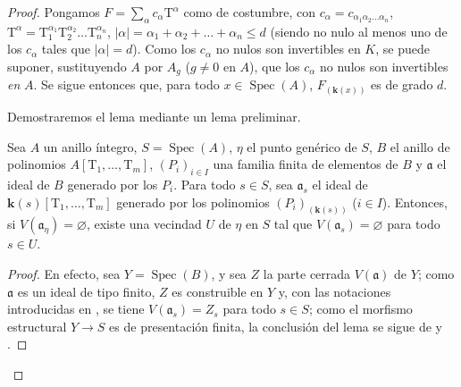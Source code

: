 \begin{proof}
Pongamos $F=\sum_\alpha c_\alpha\mathrm T^\alpha$ como de costumbre, con $c_\alpha=c_{\alpha_1\alpha_2\ldots\alpha_n}$, $\mathrm T^\alpha=\mathrm T_1^{\alpha_1}\mathrm T_2^{\alpha_2}\ldots
\mathrm T_n^{\alpha_n}$, $|\alpha|=\alpha_1+\alpha_2+\ldots+\alpha_n\leqslant d$ (siendo no nulo al menos uno de los $c_\alpha$ tales que $|\alpha|=d$).
Como los $c_\alpha$ no nulos son invertibles en $K$, se puede suponer, sustituyendo $A$ por $A_g$ ($g\neq0$ en $A$), que los $c_\alpha$ no nulos son invertibles \emph{en} $A$.
Se sigue entonces que, para todo $x\in\operatorname{Spec}(A)$, $F_{(\mathbf{k}(x))}$ es de grado $d$.

Demostraremos el lema mediante un lema preliminar.

\begin{lemma}[9.7.5.1]
\label{IV.9.7.5.1}
Sea $A$ un anillo íntegro, $S=\operatorname{Spec}(A)$, $\eta$ el punto genérico de $S$, $B$ el anillo de polinomios $A[\mathrm T_1,\ldots,\mathrm T_m]$, $(P_i)_{i\in I}$ una familia finita de elementos de $B$ y $\mathfrak a$ el ideal de $B$ generado por los $P_i$.
Para todo $s\in S$, sea $\mathfrak a_s$ el ideal de $\boldsymbol{k}(s)[\mathrm T_1,\ldots,\mathrm T_m]$ generado por los polinomios $(P_i)_{(\mathbf{k}(s))}$ ($i\in I$).
Entonces, si $V(\mathfrak a_\eta)=\varnothing$, existe una vecindad $U$ de $\eta$ en $S$ tal que $V(\mathfrak a_s)=\varnothing$ para todo $s\in U$.
\end{lemma}

\begin{proof}
En efecto, sea $Y=\operatorname{Spec}(B)$, y sea $Z$ la parte cerrada $V(\mathfrak a)$ de $Y$; como $\mathfrak a$ es un ideal de tipo finito, $Z$ es construible en $Y$  y, con las notaciones introducidas en , se tiene $V(\mathfrak a_s)=Z_s$ para todo $s\in S$; como el morfismo estructural $Y\to S$ es de presentación finita, la conclusión del lema se sigue de  y .
\end{proof}


\end{proof}
